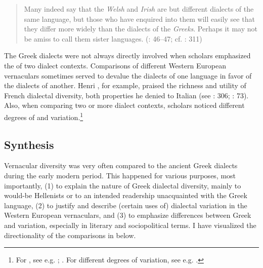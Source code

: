 \begin{quote}
Many indeed say that the \textit{Welsh} and \textit{Irish} are but different dialects of the same language, but those who have enquired into them will easily see that they differ more widely than the dialects of the \textit{Greeks}. Perhaps it may not be amiss to call them sister languages. (\citealt{Malcolm1738}: 46–47; cf. \citealt{Macnicol1779}: 311)
\end{quote}

The Greek dialects were not always directly involved when scholars emphasized the  of two dialect contexts. Comparisons of different Western European vernaculars sometimes served to devalue the dialects of one language in favor of the dialects of another. Henri \citet[133--134]{Estienne1579}, for example, praised the richness and utility of French dialectal diversity, both properties he denied to Italian (see \citealt{Swiggers1997}: 306; \citeyear{Swiggers2009}: 73). Also, when comparing two or more  dialect contexts, scholars noticed different degrees of  and variation.\footnote{For , see e.g. \citet[158\textsc{\textsuperscript{r}}\textsc{–158}\textsc{\textsuperscript{v}}]{Hosius1560}; \citet[77 – I refer to the German translation of the Swedish original, published in 1746/1747]{Hogstrom1748}. For different degrees of variation, see e.g. \citet[27, 57]{Sajnovics1770}.}

\subsection{Synthesis}

Vernacular diversity was very often compared to the ancient Greek dialects during the early modern period. This happened for various purposes, most importantly, (1) to explain the nature of Greek dialectal diversity, mainly to would-be Hellenists or to an intended readership unacquainted with the Greek language, (2) to justify and describe (certain uses of) dialectal variation in the Western European vernaculars, and (3) to emphasize differences between Greek and  variation, especially in literary and sociopolitical terms. I have visualized the directionality of the comparisons in  below.

